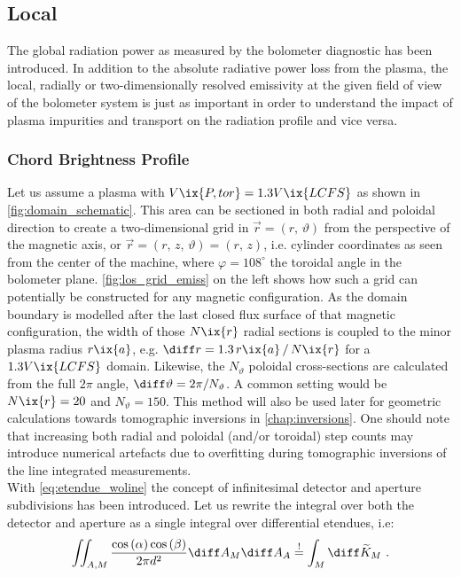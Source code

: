         \subsection{Local}\label{subsec:local}%
%
            The global radiation power as measured by the bolometer diagnostic has been introduced. In addition to the absolute radiative power loss from the plasma, the local, radially or two-dimensionally resolved emissivity at the given field of view of the bolometer system is just as important in order to understand the impact of plasma impurities and transport on the radiation profile and vice versa.%
%
            \subsubsection*{Chord Brightness Profile}%
%
                Let us assume a plasma with $V\ix{P, tor}=1.3V\ix{LCFS}$ as shown in \cref{fig:domain_schematic}. This area can be sectioned in both radial and poloidal direction to create a two-dimensional grid in $\vec{r}=\left(r,\,\vartheta\right)$ from the perspective of the magnetic axis, or $\vec{r}=\left(r,\,z,\,\vartheta\right)=\left(r,\,z\right)$, i.e. cylinder coordinates as seen from the center of the machine, where $\varphi=108^{\circ}$ the toroidal angle in the bolometer plane. \autoref{fig:los_grid_emiss} on the left shows how such a grid can potentially be constructed for any magnetic configuration. As the domain boundary is modelled after the last closed flux surface of that magnetic configuration, the width of those $N\ix{r}$ radial sections is coupled to the minor plasma radius $r\ix{a}$, e.g. $\diff r=1.3\,r\ix{a}\,/\,N\ix{r}$ for a $1.3V\ix{LCFS}$ domain. Likewise, the $N_{\vartheta}$ poloidal cross-sections are calculated from the full $2\pi$ angle, $\diff\vartheta=2\pi/N_{\vartheta}$. A common setting would be $N\ix{r}=20$ and $N_{\vartheta}=150$. This method will also be used later for geometric calculations towards tomographic inversions in \cref{chap:inversions}. One should note that increasing both radial and poloidal (and/or toroidal) step counts may introduce numerical artefacts due to overfitting during tomographic inversions of the line integrated measurements.\\%
                With \cref{eq:etendue_woline} the concept of infinitesimal detector and aperture subdivisions has been introduced. Let us rewrite the integral over both the detector and aperture as a single integral over differential etendues, i.e:%
%
                \begin{align}%
                    \iint_{A, M}\frac{\cos\left(\alpha\right)\cos\left(\beta\right)}{2\pi d^{2}}\diff A_{M}\diff A_{A}\overset{!}{=}\int_{M}\diff \widetilde{K}_{M}\,\,.\label{eq:diff_etendues}%
                \end{align}%
